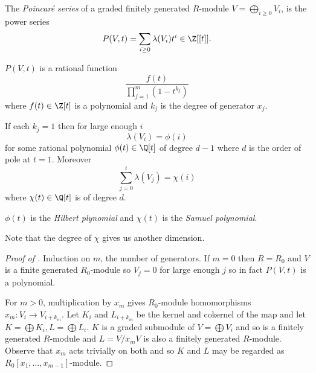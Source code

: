 \documentclass[a4paper]{article}
\begin{document}
\begin{definition}
  The \emph{Poincaré series} of a graded finitely generated \(R\)-module \(V = \bigoplus_{i \geq 0} V_i\), is the power series
  \[
    P(V, t) = \sum_{i \geq 0} \lambda(V_i) t^i \in \Z[[t]].
  \]
\end{definition}

\begin{theorem}
  \label{thm:Hilbert-Serre}
  \(P(V, t)\) is a rational function
  \[
    \frac{f(t)}{\prod_{j =1}^m (1 - t^{k_j})}
  \]
  where \(f(t) \in \Z[t]\) is a polynomial and \(k_j\) is the degree of generator \(x_j\).
\end{theorem}

\begin{corollary}
  If each \(k_j = 1\) then for large enough \(i\)
  \[
    \lambda(V_i) = \phi(i)
  \]
  for some rational polynomial \(\phi(t) \in \Q[t]\) of degree \(d - 1\) where \(d\) is the order of pole at \(t = 1\). Moreover
  \[
    \sum_{j = 0}^i \lambda(V_j) = \chi(i)
  \]
  where \(\chi(t) \in \Q[t]\) is of degree \(d\).
\end{corollary}

\begin{definition}
  \(\phi(t)\) is the \emph{Hilbert plynomial} and \(\chi(t)\) is the \emph{Samuel polynomial}.
\end{definition}

Note that the degree of \(\chi\) gives us another dimension.

\begin{proof}[Proof of ]
  Induction on \(m\), the number of generators. If \(m = 0\) then \(R = R_0\) and \(V\) is a finite generated \(R_0\)-module so \(V_j = 0\) for large enough \(j\) so in fact \(P(V, t)\) is a polynomial.

  For \(m > 0\), multiplication by \(x_m\) gives \(R_0\)-module homomorphisms \(x_m: V_i \to V_{i + k_m}\). Let \(K_i\) and \(L_{i + k_m}\) be the kernel and cokernel of the map and let \(K = \bigoplus K_i, L = \bigoplus L_i\). \(K\) is a graded submodule of \(V = \bigoplus V_i\) and so is a finitely generated \(R\)-module and \(L = V/x_mV\) is also a finitely generated \(R\)-module. Observe that \(x_m\) acts trivially on both and so \(K\) and \(L\) may be regarded as \(R_0[x_1, \dots, x_{m - 1}]\)-module.
\end{proof}
\end{document}
